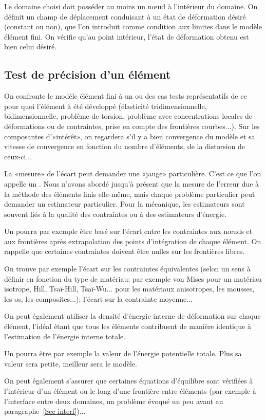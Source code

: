 Le domaine choisi doit posséder au moins un nœud à l'intérieur du domaine. On définit un champ de déplacement conduisant à un état de déformation désiré (constant ou non), que l'on introduit comme condition aux limites dans le modèle élément fini. On vérifie qu'au point intérieur, l'état de déformation obtenu est bien celui désiré.

\medskip
\subsection{Test de précision d'un élément}

On confronte le modèle élément fini à un ou des cas tests représentatifs de ce pour quoi l'élément à été développé (élasticité tridimensionnelle, bidimensionnelle, problème de torsion, problème avec concentrations locales de déformations ou de contraintes, prise en compte des frontières courbes...).
Sur les composantes d'«intérêt», on regardera s'il y a bien convergence du modèle et sa vitesse de convergence en fonction du nombre d'éléments, de la distorsion de ceux-ci...

\medskip
La «mesure» de l'écart peut demander une «jauge» particulière. C'est ce que l'on appelle un . Nous n'avons abordé jusqu'à présent que la mesure de l'erreur due à la méthode des éléments finis elle-même, mais chaque problème particulier peut demander un estimateur particulier.
Pour la mécanique, les estimateurs sont souvent liés à la qualité des contraintes ou à des estimateurs d'énergie.

\medskip
Un  pourra par exemple être basé sur l'écart entre les contraintes aux nœuds et aux frontières après extrapolation des points d'intégration de chaque élément. On rappelle que certaines contraintes doivent être nulles sur les frontières libres.

On trouve par exemple l'écart sur les contraintes équivalentes (selon un sens à définir en fonction du type de matériau: par exemple von Mises pour un matériau isotrope, Hill, Tsaï-Hill, Tsaï-Wu... pour les matériaux anisotropes, les mousses, les os, les composites...); l'écart sur la contrainte moyenne...

On peut également utiliser la densité d'énergie interne de déformation sur chaque élément, l'idéal étant que tous les éléments contribuent de manière identique à l'estimation de l'énergie interne totale.

\medskip
Un  pourra être par exemple la valeur de l'énergie potentielle totale. Plus sa valeur sera petite, meilleur sera le modèle.

\medskip
On peut également s'assurer que certaines équations d'équilibre sont vérifiées à l'intérieur d'un élément ou le long d'une frontière entre éléments (par exemple à l'interface entre deux domaines, un problème évoqué un peu avant au paragraphe~\ref{Sec-interf})...


